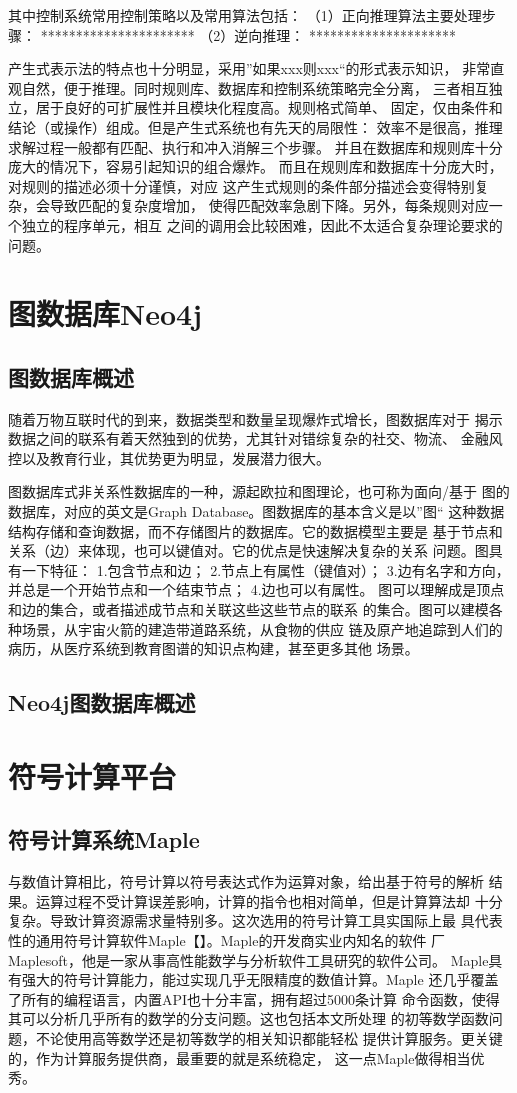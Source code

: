 \documentclass{standalone}
\begin{document}
其中控制系统常用控制策略以及常用算法包括：
（1）正向推理算法主要处理步骤：
**********************
（2）逆向推理：
*********************

产生式表示法的特点也十分明显，采用”如果xxx则xxx“的形式表示知识，
非常直观自然，便于推理。同时规则库、数据库和控制系统策略完全分离，
三者相互独立，居于良好的可扩展性并且模块化程度高。规则格式简单、
固定，仅由条件和结论（或操作）组成。但是产生式系统也有先天的局限性：
效率不是很高，推理求解过程一般都有匹配、执行和冲入消解三个步骤。
并且在数据库和规则库十分庞大的情况下，容易引起知识的组合爆炸。
而且在规则库和数据库十分庞大时，对规则的描述必须十分谨慎，对应
这产生式规则的条件部分描述会变得特别复杂，会导致匹配的复杂度增加，
使得匹配效率急剧下降。另外，每条规则对应一个独立的程序单元，相互
之间的调用会比较困难，因此不太适合复杂理论要求的问题。
\section{图数据库Neo4j}
\subsection{图数据库概述}
随着万物互联时代的到来，数据类型和数量呈现爆炸式增长，图数据库对于
揭示数据之间的联系有着天然独到的优势，尤其针对错综复杂的社交、物流、
金融风控以及教育行业，其优势更为明显，发展潜力很大。

图数据库式非关系性数据库的一种，源起欧拉和图理论，也可称为面向/基于
图的数据库，对应的英文是Graph Database。图数据库的基本含义是以”图“
这种数据结构存储和查询数据，而不存储图片的数据库。它的数据模型主要是
基于节点和关系（边）来体现，也可以键值对。它的优点是快速解决复杂的关系
问题。图具有一下特征：
1.包含节点和边；
2.节点上有属性（键值对）；
3.边有名字和方向，并总是一个开始节点和一个结束节点；
4.边也可以有属性。
图可以理解成是顶点和边的集合，或者描述成节点和关联这些这些节点的联系
的集合。图可以建模各种场景，从宇宙火箭的建造带道路系统，从食物的供应
链及原产地追踪到人们的病历，从医疗系统到教育图谱的知识点构建，甚至更多其他
场景。
\subsection{Neo4j图数据库概述}
\section{符号计算平台}
\subsection{符号计算系统Maple}
与数值计算相比，符号计算以符号表达式作为运算对象，给出基于符号的解析
结果。运算过程不受计算误差影响，计算的指令也相对简单，但是计算算法却
十分复杂。导致计算资源需求量特别多。这次选用的符号计算工具实国际上最
具代表性的通用符号计算软件Maple【】。Maple的开发商实业内知名的软件
厂Maplesoft，他是一家从事高性能数学与分析软件工具研究的软件公司。
Maple具有强大的符号计算能力，能过实现几乎无限精度的数值计算。Maple
还几乎覆盖了所有的编程语言，内置API也十分丰富，拥有超过5000条计算
命令函数，使得其可以分析几乎所有的数学的分支问题。这也包括本文所处理
的初等数学函数问题，不论使用高等数学还是初等数学的相关知识都能轻松
提供计算服务。更关键的，作为计算服务提供商，最重要的就是系统稳定，
这一点Maple做得相当优秀。
\end{document}
